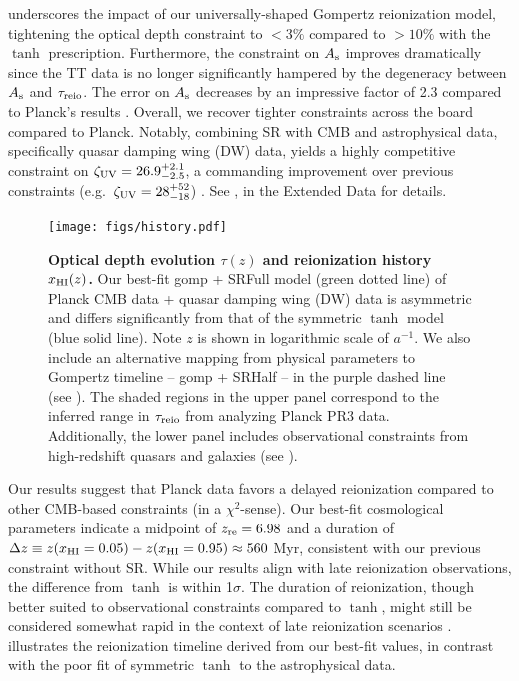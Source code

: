  underscores the impact of our universally-shaped
Gompertz reionization model, tightening the optical depth constraint to
$<3\%$ compared to $> 10\%$ with the $\tanh$ prescription.
Furthermore, the constraint on $A_\mathrm{s}$ improves dramatically since the TT
data is no longer significantly hampered by the degeneracy between $A_\mathrm{s}$
and $\tau_{\mathrm{reio}}$.
The error on $A_\mathrm{s}$ decreases by an impressive factor of 2.3 compared to
Planck's results \cite{Planck2020a}.
Overall, we recover tighter constraints across the board compared to
Planck.
Notably, combining SR with CMB and astrophysical data, specifically
quasar damping wing (DW) data, yields a highly competitive constraint on
$\zeta_\mathrm{UV} = 26.9^{+2.1}_{-2.5}$, a commanding improvement over previous
constraints (e.g.\ $\zeta_\mathrm{UV} = 28^{+52}_{-18}$) \cite{Greig2017}.
See ,  in the
Extended Data for details.

\begin{figure}[tb]
\centering
\texttt{[image: figs/history.pdf]}
\caption{\textbf{Optical depth evolution $\tau(z)$ and reionization
history $x_{\mathrm{HI}}(z)$.}
Our best-fit gomp + SRFull model (green dotted line) of Planck CMB data
+ quasar damping wing (DW) data is asymmetric and differs significantly
from that of the symmetric $\tanh$ model (blue solid line).
Note $z$ is shown in logarithmic scale of $a^{-1}$.
We also include an alternative mapping from physical parameters to
Gompertz timeline -- gomp + SRHalf -- in the purple dashed line (see
).
The shaded regions in the upper panel correspond to the inferred range
in $\tau_{\mathrm{reio}}$ from analyzing Planck PR3 data.
Additionally, the lower panel includes observational constraints from
high-redshift quasars and galaxies (see ).}
\label{fig:history} \end{figure}

Our results suggest that Planck data favors a delayed reionization
compared to other CMB-based constraints (in a $\chi^2$-sense).
Our best-fit cosmological parameters indicate a midpoint of $z_{\mathrm{re}} =
6.98$ and a duration of $\Delta z \equiv z(x_{\mathrm{HI}} = 0.05) - z(x_{\mathrm{HI}} =
0.95) \approx 560 $ Myr, consistent with our previous constraint
without SR.
While our results align with late reionization observations, the
difference from $\tanh$ is within 1$\sigma$.
The duration of reionization, though better suited to observational
constraints compared to $\tanh$, might still be considered somewhat
rapid in the context of late reionization scenarios \cite{Cain2021}.
 illustrates the reionization timeline derived from
our best-fit values, in contrast with the poor fit of symmetric $\tanh$
to the astrophysical data.

